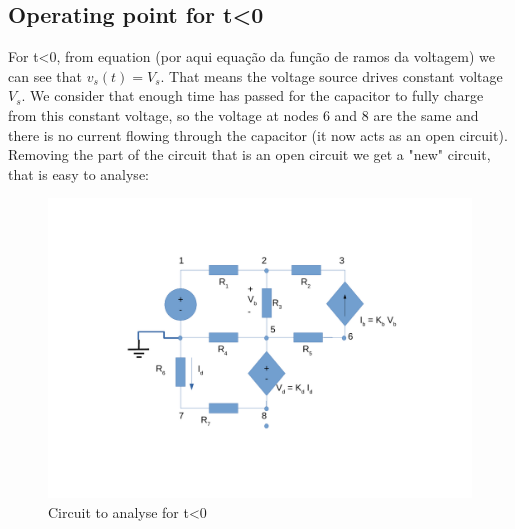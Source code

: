 \subsection{Operating point for t<0}
For t<0, from equation (por aqui equação da função de ramos da voltagem) we can see that $v_s (t)= V_s$. That means the voltage source drives constant voltage $V_s$. We consider that enough time has passed for the capacitor to fully charge from this constant voltage, so the voltage at nodes 6 and 8 are the same and there is no current flowing through the capacitor (it now acts as an open circuit). Removing the part of the circuit that is an open circuit we get a "new" circuit, that is easy to analyse: \\
\begin{figure}[h] \centering
\includegraphics[width=0.8\linewidth]{tmenor0.pdf}
\caption{Circuit to analyse for t<0}
\label{fig:zim}
\end{figure}

